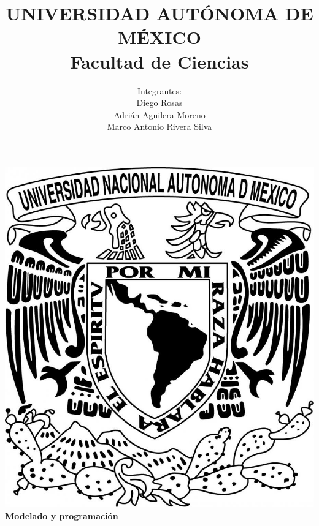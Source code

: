 \title{UNIVERSIDAD AUT\'ONOMA DE M\'EXICO\\ Facultad de Ciencias}
\author{Integrantes:\\
  Diego Rosas\\
  Adri\'an Aguilera Moreno\\
  Marco Antonio Rivera Silva}
\date{}
\maketitle
\begin{center}
  \includegraphics[scale=0.20]{../Imagen/Portada.jpg}\\[0.4cm]
  \Large
  \bf{Modelado y programación}
  \normalsize
\end{center}
\newpage
{}

